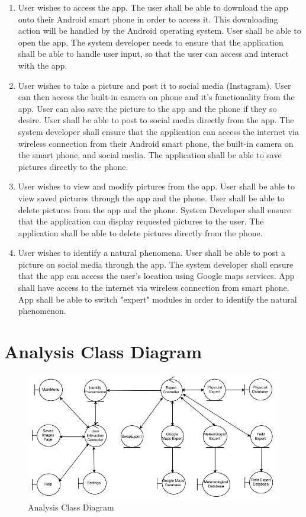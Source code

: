 \documentclass[]{article}
\begin{document}
\begin{enumerate}
	\item User wishes to access the app.  The user shall be able to download the app onto their Android smart phone in order to access it.  This downloading action will be handled by the Android operating system.  User shall be able to open the app.  The system developer needs to ensure that the application shall be able to handle user input, so that the user can access and interact with the app.
	\item User wishes to take a picture and post it to social media (Instagram).  User can then access the built-in camera on phone and it's functionality from the app.  User can also save the picture to the app and the phone if they so desire.  User shall be able to post to social media directly from the app.  The system developer shall ensure that the application can access the internet via wireless connection from their Android smart phone, the built-in camera on the smart phone, and social media.  The application shall be able to save pictures directly to the phone.
	\item User wishes to view and modify pictures from the app.  User shall be able to view saved pictures through the app and the phone.  User shall be able to delete pictures from the app and the phone.  System Developer shall ensure that the application can display requested pictures to the user.  The application shall be able to delete pictures directly from the phone.
	\item User wishes to identify a natural phenomena. User shall be able to post a picture on social media through the app.  The system developer shall ensure that the app can access the user's location using Google maps services. App shall have access to the internet via wireless connection from smart phone. App shall be able to switch "expert" modules in order to identify the natural phenomenon. 
\end{enumerate}

\section{Analysis Class Diagram}

\begin{figure}[!hb]
	\includegraphics[width=\linewidth]{AnalysisClassDiagram.png}
	\caption{Analysis Class Diagram}
\end{figure}
\end{document}
